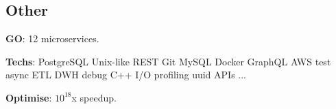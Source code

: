 \documentclass[a4paper]{MagicalCV}
\begin{document}
\begin{minipage}[t]{0.33\textwidth}
\subsection{Other}
\begin{tightemize}
\item {\bf GO}: 12 microservices.
\item {\bf Techs}: PostgreSQL \textbullet{} Unix-like \textbullet{} REST \textbullet{} Git \textbullet{} MySQL \textbullet{} Docker \textbullet{}
 GraphQL \textbullet{} AWS \textbullet{} test \textbullet{} async \textbullet{} ETL \textbullet{} DWH \textbullet{} debug \textbullet{} C++ \textbullet{} I/O \textbullet{} profiling \textbullet{} uuid \textbullet{} APIs ...
\item {\bf Optimise}: $10^{18}$x speedup.
\end{tightemize}

\end{minipage}
\hfill
\end{document}
